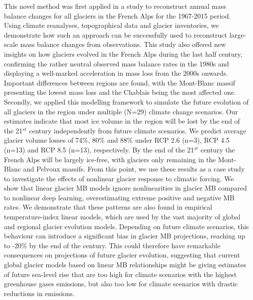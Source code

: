 This novel method was first applied in a study to reconstruct annual mass balance changes for all glaciers in the French Alps for the 1967-2015 period. Using climate reanalyses, topographical data and glacier inventories, we demonstrate how such an approach can be successfully used to reconstruct large-scale mass balance changes from observations. This study also offered new insights on how glaciers evolved in the French Alps during the last half century, confirming the rather neutral observed mass balance rates in the 1980s and displaying a well-marked acceleration in mass loss from the 2000s onwards. Important differences between regions are found, with the Mont-Blanc massif presenting the lowest mass loss and the Chablais being the most affected one. Secondly, we applied this modelling framework to simulate the future evolution of all glaciers in the region under multiple (N=29) climate change scenarios. Our estimates indicate that most ice volume in the region will be lost by the end of the 21$^{st}$ century independently from future climate scenarios. We predict average glacier volume losses of 74\%, 80\% and 88\% under RCP 2.6 (n=3), RCP 4.5 (n=13) and RCP 8.5 (n=13), respectively. By the end of the 21$^{st}$ century the French Alps will be largely ice-free, with glaciers only remaining in the Mont-Blanc and Pelvoux massifs. From this point, we use these results as a case study to investigate the effects of nonlinear glacier response to climatic forcing. We show that linear glacier MB models ignore nonlinearities in glacier MB compared to nonlinear deep learning, overestimating extreme positive and negative MB rates. We demonstrate that these patterns are also found in empirical temperature-index linear models, which are used by the vast majority of global and regional glacier evolution models. Depending on future climate scenarios, this behaviour can introduce a significant bias in glacier MB projections, reaching up to -20\% by the end of the century. This could therefore have remarkable consequences on projections of future glacier evolution, suggesting that current global glacier models based on linear MB relationships might be giving estimates of future sea-level rise that are too high for climate scenarios with the highest greenhouse gases emissions, but also too low for climate scenarios with drastic reductions in emissions. 

